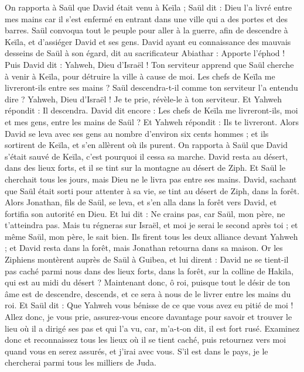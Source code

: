 \begin{multicols}{2}
On rapporta à Saül que David était venu à Keïla ; Saül dit : Dieu l'a livré entre mes mains car il s'est enfermé en entrant dans une ville qui a des portes et des barres.
Saül convoqua tout le peuple pour aller à la guerre, afin de descendre à Keïla, et d'assiéger David et ses gens.
David ayant eu connaissance des mauvais desseins de Saül à son égard, dit au sacrificateur Abiathar : Apporte l'éphod !
Puis David dit : Yahweh, Dieu d'Israël ! Ton serviteur apprend que Saül cherche à venir à Keïla, pour détruire la ville à cause de moi.
Les chefs de Keïla me livreront-ils entre ses mains ? Saül descendra-t-il comme ton serviteur l'a entendu dire ? Yahweh, Dieu d'Israël ! Je te prie, révèle-le à ton serviteur. Et Yahweh répondit : Il descendra.
David dit encore : Les chefs de Keïla me livreront-ils, moi et mes gens, entre les mains de Saül ? Et Yahweh répondit : Ils te livreront.
Alors David se leva avec ses gens au nombre d’environ six cents hommes ; et ils sortirent de Keïla, et s'en allèrent où ils purent. On rapporta à Saül que David s'était sauvé de Keïla, c'est pourquoi il cessa sa marche.
David resta au désert, dans des lieux forts, et il se tint sur la montagne au désert de Ziph. Et Saül le cherchait tous les jours, mais Dieu ne le livra pas entre ses mains.
David, sachant que Saül était sorti pour attenter à sa vie, se tint au désert de Ziph, dans la forêt.
Alors Jonathan, fils de Saül, se leva, et s'en alla dans la forêt vers David, et fortifia son autorité en Dieu.
Et lui dit : Ne crains pas, car Saül, mon père, ne t’atteindra pas. Mais tu régneras sur Israël, et moi je serai le second après toi ; et même Saül, mon père, le sait bien.
Ils firent tous les deux alliance devant Yahweh ; et David resta dans la forêt, mais Jonathan retourna dans sa maison.
Or les Ziphiens montèrent auprès de Saül à Guibea, et lui dirent : David ne se tient-il pas caché parmi nous dans des lieux forts, dans la forêt, sur la colline de Hakila, qui est au midi du désert ?
Maintenant donc, ô roi, puisque tout le désir de ton âme est de descendre, descends, et ce sera à nous de le livrer entre les mains du roi.
Et Saül dit : Que Yahweh vous bénisse de ce que vous avez eu pitié de moi !
Allez donc, je vous prie, assurez-vous encore davantage pour savoir et trouver le lieu où il a dirigé ses pas et qui l’a vu, car, m’a-t-on dit, il est fort rusé.
Examinez donc et reconnaissez tous les lieux où il se tient caché, puis retournez vers moi quand vous en serez assurés, et j'irai avec vous. S'il est dans le pays, je le chercherai parmi tous les milliers de Juda.

\end{multicols}
